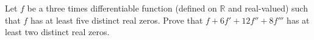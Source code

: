 Let $f$ be a three times differentiable function (defined on $\mathbb{R}$ and real-valued) such that $f$ has at least five distinct real zeros. Prove that $f+6f'+12f''+8f'''$ has at least two distinct real zeros.